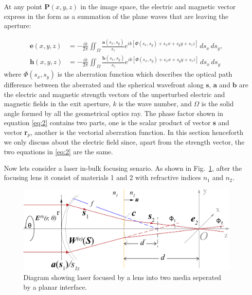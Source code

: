 \documentclass[9pt,twocolumn,twoside]{osajnl}
\begin{document}
At any point $\textbf{P}(x,y,z)$ in the image space, the electric and magnetic vector express in the form as a summation of the plane waves that are leaving the aperture:

\begin{equation}
	\begin{aligned}\label{eq:2}
		\textbf{e}(x, y, z)&=-\frac{ik}{2\pi}\iint_\Omega\frac{\textbf{a}(s_x, s_y)}{s_z}e^{ik[\textbf{$\Phi$}(s_x, s_y)+s_xx+s_yy+s_zz]}\,ds_x\,ds_y,\\
		\textbf{h}(x, y, z)&=-\frac{ik}{2\pi}\iint_\Omega\frac{\textbf{b}(s_x, s_y)}{s_z}e^{ik[\textbf{$\Phi$}(s_x, s_y)+s_xx+s_yy+s_zz]}\,ds_x\,ds_y
	\end{aligned}
\end{equation}
where $\textbf{$\Phi$}(s_x, s_y)$ is the aberration function which describes the optical path difference between the aberrated and the spherical wavefront along $\textbf{s}$, $\textbf{a}$ and $\textbf{b}$ are the electric and magnetic strength vectors of the unperturbed electric and magnetic fields in the exit aperture, $k$ is the wave number, and $\Omega$ is the solid angle formed by all the geometrical optics ray. The phase factor shown in equation \eqref{eq:2} contains two parts, one is the scalar product of vector \textbf{s} and vector \textbf{r}$_p$, another is the vectorial aberration function. In this section henceforth we only discuss about the electric field since, apart from the strength vector, the two equations in \eqref{eq:2} are the same. 

Now lets consider a laser in-bulk focusing senario. As shown in Fig.~\ref{fig:1}, after the focusing lens it consist of materials 1 and 2 with refractive indices $n_1$ and $n_2$.

\begin{figure}
	\centering
	\includegraphics[width=\linewidth]{../AppOptics/figures/vectorDiffractionTheory.pdf}
	\caption{Diagram showing laser focused by a lens into two media seperated by a planar interface.}\label{fig:1}
\end{figure}
\end{document}
